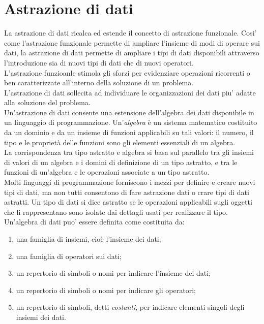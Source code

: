 \documentclass[12pt]{report}
\begin{document}
	\section{Astrazione di dati}
	La astrazione di dati ricalca ed estende il concetto di astrazione funzionale. Cosi' come l'astrazione funzionale permette di ampliare l'insieme di modi di operare sui dati, la astrazione di dati permette di ampliare i tipi di dati disponibili attraverso l'introduzione sia di nuovi tipi di dati che di nuovi operatori. \\
	L'astrazione funzioanle stimola gli sforzi per evidenziare operazioni ricorrenti o ben caratterizzate all'interno della soluzione di un problema.  \\
	L'astrazione di dati sollecita ad individuare le organizzazioni dei dati piu' adatte alla soluzione del problema. \\
	Un'astrazione di dati consente una estensione dell'algebra dei dati disponibile in un linguaggio di programmazione. Un'\textit{algebra} è un sistema matematico costituito da un dominio e da un insieme di funzioni applicabili su tali valori: il numero, il tipo e le proprietà delle funzioni sono gli elementi essenziali di un algebra. \\
	La corrispondenza tra tipo astratto e algebra si basa sul parallelo tra gli insiemi di valori di un algebra e i domini di definizione di un tipo astratto, e tra le funzioni di un'algebra e le operazioni associate a un tipo astratto. \\
	Molti linguaggi di programmazione forniscono i mezzi per definire e creare nuovi tipi di dati, ma non tutti consentono di fare astrazione dati o crare tipi di dati astratti. Un tipo di dati si dice astratto se le operazioni applicabili sugli oggetti che li rappresentano sono isolate dai dettagli usati per realizzare il tipo. \\
	Un'algebra di dati puo' essere definita come costituita da:
	\begin{enumerate}[label=- \Alph*)]
		\item una famiglia di insiemi, cioè l'insieme dei dati;
		\item una famiglia di operatori sui dati;
		\item un repertorio di simboli o nomi per indicare l'insieme dei dati;
		\item un repertorio di simboli o nomi per indicare gli operatori;
		\item un repertorio di simboli, detti \textit{costanti}, per indicare elementi singoli degli insiemi dei dati.
	\end{enumerate}
\end{document}
